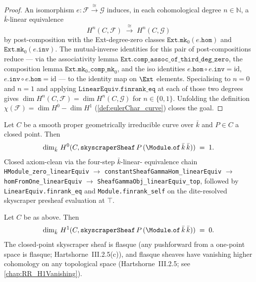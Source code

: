 \begin{proof}
  An isomorphism \(e \colon \mathcal F \xrightarrow{\;\cong\;} \mathcal G\)
  induces, in each cohomological degree \(n \in \mathbb N\), a
  \(\bar k\)-linear equivalence
  \[
    H^n(C, \mathcal F) \;\xrightarrow{\;\cong\;}\; H^n(C, \mathcal G)
  \]
  by post-composition with the Ext-degree-zero classes
  \(\mathtt{Ext.mk}_0(e.\mathtt{hom})\) and
  \(\mathtt{Ext.mk}_0(e.\mathtt{inv})\). The mutual-inverse identities
  for this pair of post-compositions reduce — via the associativity
  lemma \(\mathtt{Ext.comp\_assoc\_of\_third\_deg\_zero}\), the
  composition lemma \(\mathtt{Ext.mk}_0\mathtt{\_comp\_mk}_0\), and the
  iso identities \(e.\mathtt{hom} \circ e.\mathtt{inv} = \mathrm{id}\),
  \(e.\mathtt{inv} \circ e.\mathtt{hom} = \mathrm{id}\) — to the identity
  map on \(\Ext\) elements. Specialising to \(n = 0\) and \(n = 1\) and
  applying \(\mathtt{LinearEquiv.finrank\_eq}\) at each of those two
  degrees gives
  \(\dim H^n(C, \mathcal F) = \dim H^n(C, \mathcal G)\) for
  \(n \in \{0, 1\}\). Unfolding the definition
  \(\chi(\mathcal F) = \dim H^0 - \dim H^1\)
  (\cref{def:eulerChar_curve}) closes the goal.
\end{proof}

\begin{lemma}
  \label{lem:H0_skyscraperSheaf_finrank_eq_one}
  Let \(C\) be a smooth proper
  geometrically irreducible curve over \(\bar k\) and \(P \in C\) a closed
  point. Then
  \[
    \dim_{\bar k}\, H^0(C, \mathtt{skyscraperSheaf}\, P\,
      (\Module.\mathtt{of}\, \bar k\, \bar k)) \;=\; 1.
  \]
  Closed axiom-clean via the four-step \(\bar k\)-linear-
  equivalence chain \texttt{HModule\_zero\_linearEquiv}
  \(\to\) \texttt{constantSheafGammaHom\_linearEquiv}
  \(\to\) \texttt{homFromOne\_linearEquiv}
  \(\to\) \texttt{SheafGammaObj\_linearEquiv\_top}, followed by
  \texttt{LinearEquiv.finrank\_eq} and \texttt{Module.finrank\_self}
  on the dite-resolved skyscraper presheaf evaluation at \(\top\).
\end{lemma}

\begin{lemma}

  \label{lem:H1_skyscraperSheaf_finrank_eq_zero}
  Let \(C\) be as above. Then
  \[
    \dim_{\bar k}\, H^1(C, \mathtt{skyscraperSheaf}\, P\,
      (\Module.\mathtt{of}\, \bar k\, \bar k)) \;=\; 0.
  \]
  The closed-point skyscraper sheaf is flasque (any pushforward from a
  one-point space is flasque; Hartshorne~III.2.5(c)), and flasque sheaves
  have vanishing higher cohomology on any topological space
  (Hartshorne~III.2.5; see \cref{chap:RR_H1Vanishing}).
\end{lemma}


